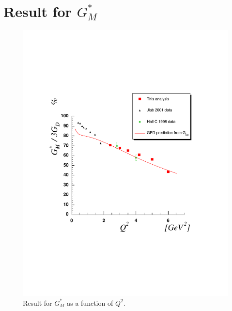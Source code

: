 \cia
\section{Result for $G_M^*$ }
\label{sec:gmresult}






\begin{figure}[h]
 \begin{center}
 \includegraphics[width = 12cm, bb=30 130 520 600]{analysis/img/GMGDIP} 
  \caption[Result for $R_{SM}$ as a function of $Q^2$]
          {  Result for $G^*_M$ as a function of $Q^2$.}
 \label{fig:GMGDIP}
\end{center}
\end{figure}




